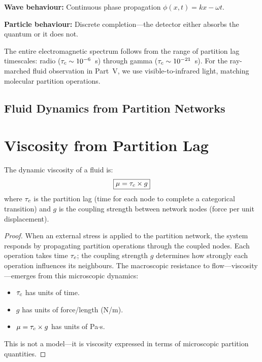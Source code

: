 \textbf{Wave behaviour:} Continuous phase propagation $\phi(x,t) = kx - \omega t$.

\textbf{Particle behaviour:} Discrete completion---the detector either absorbs the quantum or it does not.

The entire electromagnetic spectrum follows from the range of partition lag timescales: radio ($\tau_c \sim 10^{-6}$~s) through gamma ($\tau_c \sim 10^{-21}$~s). For the ray-marched fluid observation in Part~V, we use visible-to-infrared light, matching molecular partition operations.


\subsection{Fluid Dynamics from Partition Networks}
\label{part:fluid}

\section{Viscosity from Partition Lag}
\label{sec:viscosity}

\begin{theorem}
\label{thm:viscosity}
The dynamic viscosity of a fluid is:
\begin{equation}
\boxed{\mu = \tau_c \times g}
\end{equation}
where $\tau_c$ is the partition lag (time for each node to complete a categorical transition) and $g$ is the coupling strength between network nodes (force per unit displacement).
\end{theorem}

\begin{proof}
When an external stress is applied to the partition network, the system responds by propagating partition operations through the coupled nodes. Each operation takes time $\tau_c$; the coupling strength $g$ determines how strongly each operation influences its neighbours. The macroscopic resistance to flow---viscosity---emerges from this microscopic dynamics:
\begin{itemize}
    \item $\tau_c$ has units of time.
    \item $g$ has units of force/length (N/m).
    \item $\mu = \tau_c \times g$ has units of Pa$\cdot$s.
\end{itemize}
This is not a model---it is viscosity expressed in terms of microscopic partition quantities.
\end{proof}

